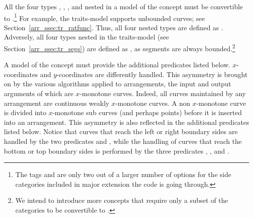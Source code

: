 All the four types ,
, , and
 nested in a model of the concept
 must be convertible to
.\footnote{The tags
   and  are only
  two out of a larger number of options for the side categories
  included in major extension the code is going through.}
For example, the  traits-model supports
unbounded curves; see Section~\ref{arr_ssec:tr_ratfunc}. Thus, all
four nested types are defined as .
Adversely, all four types nested in the 
traits-model (see Section~\ref{arr_ssec:tr_segs}) are defined as
, as segments are always
bounded.\footnote{We intend to introduce more concepts that require
  only a subset of the categories to be convertible to
  .}

A model of the concept  must provide
the additional predicates listed below. 
$x$-coordinates and $y$-coordinates are differently handled. This
asymmetry is brought on by the various algorithms applied to
arrangements, the input and output arguments of which are $x$-monotone
curves. Indeed, all curves maintained by any arrangement are
continuous weakly $x$-monotone curves. A non $x$-monotone curve is
divided into $x$-monotone sub curves (and perhaps points) before it
is inserted into an arrangement. This asymmetry is also reflected in
the additional predicates listed below. Notice that curves that reach
the left or right boundary sides are handled by the two predicates
 and ,
while the handling of curves that reach the bottom or top boundary
sides is performed by the three predicates
, , and
.

